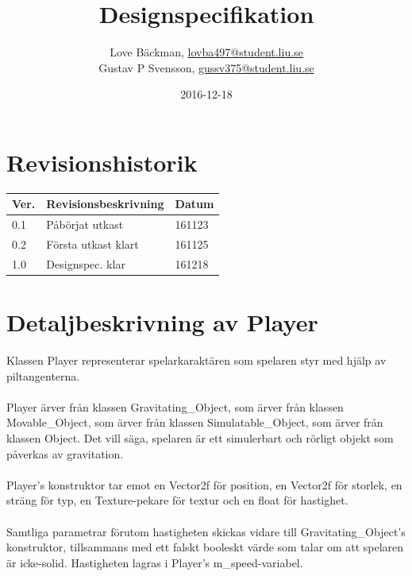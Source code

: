 \documentclass{TDP003mall}
\author{Love Bäckman, \url{lovba497@student.liu.se} \\
    Gustav P Svensson, \url{gussv375@student.liu.se}}
\title{Designspecifikation}
\date{2016-12-18}
\begin{document}
\projectpage

\tableofcontents
\newpage

\section{Revisionshistorik}
\begin{table}[!h]
\begin{tabularx}{\linewidth}{|l|X|l|}
\hline
Ver. & Revisionsbeskrivning & Datum \\\hline
0.1 & Påbörjat utkast & 161123 \\\hline
0.2 & Första utkast klart & 161125 \\\hline
1.0 & Designspec. klar & 161218 \\\hline
\end{tabularx}
\end{table}

\section{Detaljbeskrivning av Player}
Klassen Player representerar spelarkaraktären som spelaren styr med hjälp av piltangenterna.
\\\\
Player ärver från klassen Gravitating\_Object, som ärver från klassen Movable\_Object, som ärver från klassen Simulatable\_Object, som ärver från klassen Object. Det vill säga, spelaren är ett simulerbart och rörligt objekt som påverkas av gravitation.
\\\\
Player's konstruktor tar emot en Vector2f för position, en Vector2f för storlek, en sträng för typ, en Texture-pekare för textur och en float för hastighet.
\\\\
Samtliga parametrar förutom hastigheten skickas vidare till Gravitating\_Object's konstruktor, tillsammans med ett falskt booleskt värde som talar om att spelaren är icke-solid. Hastigheten lagras i Player's m\_speed-variabel.
\end{document}
